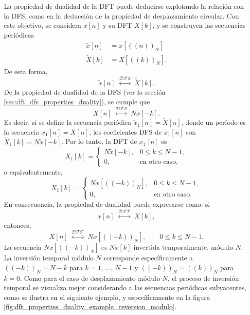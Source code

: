 \documentclass[a4paper]{report}
\begin{document}
La propiedad de dualidad de la DFT puede deducirse explotando la relación con la DFS, como en la deducción de la propiedad de desplazamiento circular. Con este objetivo, se considera \(x[n]\) y su DFT \(X[k]\), y se construyen las secuencias periódicas
\begin{equation}\label{eq:dft_properties_duality_periodized_sequences}
 \begin{aligned}
  \tilde{x}[n]&=x[((n))_N]\\
  \tilde{X}[k]&=X[((k))_N].
 \end{aligned}
\end{equation}
De  esta forma,
\[
 \tilde{x}[n]
  \;\overset{\mathcal{DFS}}{\longleftrightarrow}\;
 \tilde{X}[k].
\]
De la propiedad de dualidad de la DFS (ver la sección \ref{sec:dft_dfs_properties_duality}), se cumple que  
\[
 \tilde{X}[n]
  \;\overset{\mathcal{DFS}}{\longleftrightarrow}\;
 N\tilde{x}[-k].
\]
Es decir, si se define la secuencia periódica \(\tilde{x}_1[n]=\tilde{X}[n]\), donde un período es la secuencia \(x_1[n]=X[n]\), los coeficientes DFS de \(\tilde{x}_1[n]\) son \(\tilde{X}_1[k]=N\tilde{x}[-k]\). Por lo tanto, la DFT de \(x_1[n]\) es
\[
 X_1[k]=
 \left\{
 \begin{array}{ll}
  N\tilde{x}[-k], & 0\leq k\leq N-1,\\
  0, & \textrm{en otro caso,}
 \end{array}
 \right.  
\]
o equivalentemente,
\[
 X_1[k]=
 \left\{
 \begin{array}{ll}
  Nx[((-k))_N], & 0\leq k\leq N-1,\\
  0, & \textrm{en otro caso.}
 \end{array}
 \right.  
\]
En consecuencia, la propiedad de dualidad puede expresarse como: si
\[
 x[n]
  \;\overset{\mathcal{DFT}}{\longleftrightarrow}\;
 X[k],
\]
entonces,
\begin{equation}\label{eq:dft_properties_duality}
 X[n]
  \;\overset{\mathcal{DFT}}{\longleftrightarrow}\;
 Nx[((-k))_N],\qquad0\leq k\leq N-1. 
\end{equation}
La secuencia \(Nx[((-k))_N]\) es \(Nx[k]\) invertida temporalmente, módulo \(N\). La inversión temporal módulo \(N\) corresponde específicamente a \(((-k))_N=N-k\) para \(k=1,\,\dots,\,N-1\) y \(((-k))_N=((k))_N\) para \(k=0\). Como para el caso de desplazamiento módulo \(N\), el proceso de inversión temporal se visualiza mejor considerando a las secuencias periódicas subyacentes, como se ilustra en el siguiente ejemplo, y específicamente en la figura \ref{fig:dft_properties_duality_example_reversion_modulo}.
\end{document}

